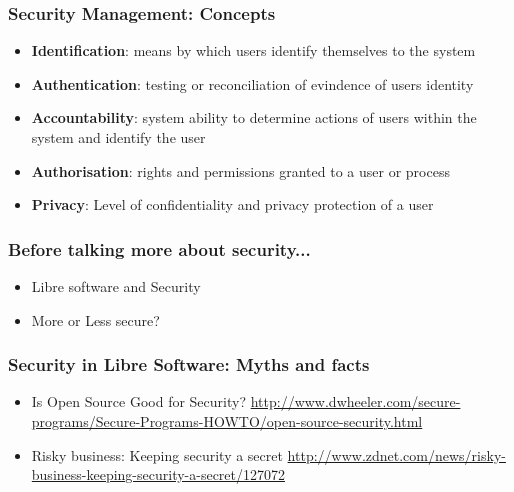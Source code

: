 \documentclass{beamer}
\begin{document}


\begin{frame}
\frametitle{Security Management: Concepts}
\begin{itemize}
\item {\bf Identification}: means by which users identify themselves to the system
\item {\bf Authentication}: testing or reconciliation of evindence of users identity
\item {\bf Accountability}: system ability to determine actions of users within the system and identify the user
\item {\bf Authorisation}: rights and permissions granted to a user or process
\item {\bf Privacy}: Level of confidentiality and privacy protection of a user
\end{itemize}
\end{frame}




\begin{frame}
\frametitle{Before talking more about security...}

\begin{itemize}
\item Libre software and Security
\item More or Less secure?
\end{itemize}

\end{frame}



\begin{frame}
\frametitle{Security in Libre Software: Myths and facts}
\begin{itemize}

  \item Is Open Source Good for Security?
  \url{http://www.dwheeler.com/secure-programs/Secure-Programs-HOWTO/open-source-security.html}
  \item Risky business: Keeping security a secret
  \url{http://www.zdnet.com/news/risky-business-keeping-security-a-secret/127072}

\end{itemize}
\end{frame}

\end{document}
